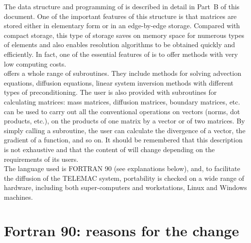 The data structure and programming of \bief is described in detail in Part~B of
this document. One of the important features of this structure is that matrices
are stored either in elementary form or in an edge-by-edge storage. Compared
with compact storage, this type of storage saves on memory space for numerous
types of elements and also enables resolution algorithms to be obtained quickly
and efficiently. In fact, one of the essential features of \bief is to offer
methods with very low computing costs.
\\
\bief offers a whole range of subroutines. They include methods for solving
advection equations, diffusion equations, linear system inversion methods with
different types of preconditioning. The user is also provided with subroutines
for calculating matrices: mass matrices, diffusion matrices, boundary matrices,
etc. \bief can be used to carry out all the conventional operations on vectors
(norms, dot products, etc.), on the products of one matrix by a vector or of
two matrices. By simply calling a subroutine, the user can calculate the
divergence of a vector, the gradient of a function, and so on. It should be
remembered that this description is not exhaustive and that the content of \bief
will change depending on the requirements of its users.
\\
The language used is FORTRAN 90 (see explanations below), and, to facilitate
the diffusion of the TELEMAC system, portability is checked on a wide range of
hardware, including both super-computers and workstations, Linux and Windows
machines.

\section{Fortran 90: reasons for the change}

